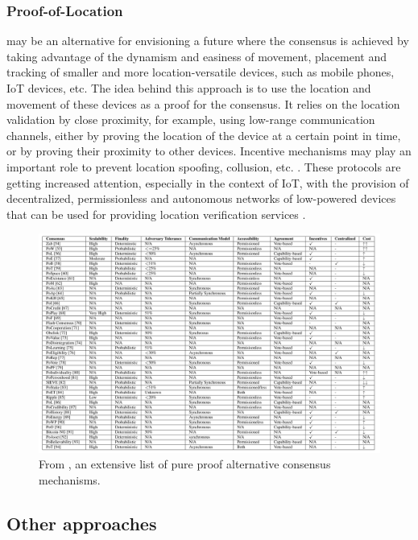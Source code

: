 \documentclass[journal]{IEEEtran}
\begin{document}
\subsubsection{Proof-of-Location} may be an alternative for envisioning a future where the
consensus is achieved by taking advantage of the dynamism and easiness of movement, placement and 
tracking of smaller and more location-versatile devices, such as mobile phones, IoT devices, etc.
The idea behind this approach is to use the location and movement of these devices 
as a proof for the consensus. It relies on the location validation by close proximity, 
for example, using low-range communication channels, either by proving the location
of the device at a certain point in time, or by proving their proximity to other devices.
Incentive mechanisms may play an important role to prevent location spoofing, collusion, etc. \cite{natoli2019deconstructing}.
These protocols are getting increased attention, especially in the context of IoT, 
with the provision of decentralized, permissionless and autonomous networks of 
low-powered devices that can be used for providing location verification services \cite{9376868}.

\begin{figure}[h]
  \centering
  \captionsetup{justification=centering}
  \includegraphics[width=\textwidth]{proof-alternative-consensus}
  \caption{From \cite{9376868}, an extensive list of pure proof alternative consensus mechanisms.}
  \label{fig:proof-alternative-consensus}
\end{figure}

\subsection{Other approaches}
\end{document}
